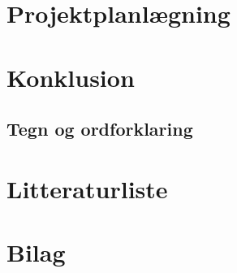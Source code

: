 \documentclass[12pt,oneside,a4paper,english]{article}
\begin{document}
\newpage
\section{Projektplanlægning}

\thispagestyle{fancy}

\newpage
\section{Konklusion}

\thispagestyle{fancy}

\newpage
\begin{flushleft}
\section{Tegn og ordforklaring}
\end{flushleft}

\thispagestyle{fancy}

\newpage
\section{Litteraturliste}


\newpage
\section{Bilag}
\label{endOfText}
\label{endOfDoc}
\end{document}
